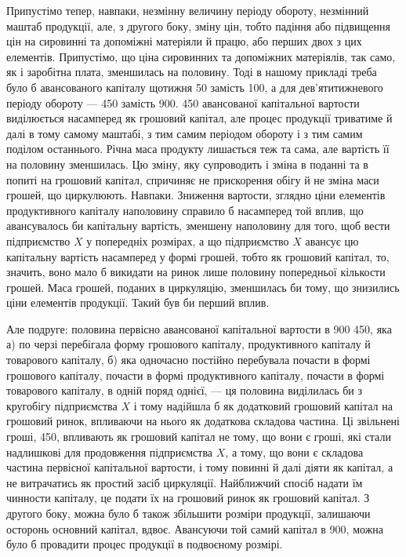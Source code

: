 \parcont{}  %
Припустімо тепер, навпаки, незмінну величину періоду обороту, незмінний
маштаб продукції, але, з другого боку, зміну цін, тобто падіння або
підвищення цін на сировинні та допоміжні матеріяли й працю, або перших
двох з цих елементів. Припустімо, що ціна сировинних та допоміжних
матеріялів, так само, як і заробітна плата, зменшилась на половину.
Тоді в нашому прикладі треба було б авансованого капіталу щотижня
50 замість 100, а для дев'ятитижневого періоду обороту — 450 замість 900. 450 авансованої капітальної
вартости виділюється насамперед як грошовий капітал, але процес продукції
триватиме й далі в тому самому маштабі, з тим самим періодом
обороту і з тим самим поділом останнього. Річна маса продукту лишається
теж та сама, але вартість її на половину зменшилась. Цю зміну, яку
супроводить і зміна в поданні та в попиті на грошовий капітал, спричиняє
не прискорення обігу й не зміна маси грошей, що циркулюють. Навпаки.
Зниження вартости, зглядно ціни елементів продуктивного капіталу
наполовину справило б насамперед той вплив, що авансувалось би капітальну
вартість, зменшену наполовину для того, щоб вести підприємство
$X$ у попередніх розмірах, а що підприємство $X$ авансує цю капітальну
вартість насамперед у формі грошей, тобто як грошовий капітал,
то, значить, воно мало б викидати на ринок лише половину попередньої
кількости грошей. Маса грошей, поданих в циркуляцію, зменшилась би
тому, що знизились ціни елементів продукції. Такий був би перший вплив.

Але подруге: половина первісно авансованої капітальної вартости в
900 \deq{} 450, яка а) по черзі перебігала форму грошового
капіталу, продуктивного капіталу й товарового капіталу, б) яка одночасно
постійно перебувала почасти в формі грошового капіталу, почасти
в формі продуктивного капіталу, почасти в формі товарового капіталу,
в одній поряд однієї, — ця половина виділилась би з
кругобігу підприємства $X$ і тому надійшла б як додатковий грошовий
капітал на грошовий ринок, впливаючи на нього як додаткова складова
частина. Ці звільнені гроші, 450, впливають як грошовий капітал
не тому, що вони є гроші, які стали надлишкові для продовження
підприємства $X$, а тому, що вони є складова частина первісної капітальної
вартости, і тому повинні й далі діяти як капітал, а не витрачатись як
простий засіб циркуляції. Найближчий спосіб надати їм чинности капіталу,
це подати їх на грошовий ринок як грошовий капітал. З другого боку,
можна було б також збільшити розміри продукції, залишаючи осторонь
основний капітал, вдвоє. Авансуючи той самий капітал в 900, можна було б провадити процес продукції в подвоєному розмірі.

